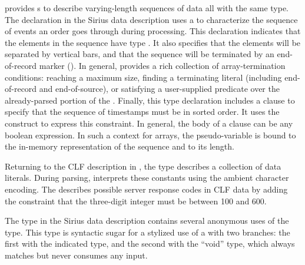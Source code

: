 \documentclass[times]{acm-sigplan}
\newcommand{\dibbler}{Sirius}
\begin{document}
\pads{} provides s to describe varying-length sequences of data all 
with the same type.  The  declaration in the \dibbler{} data description
uses a  to characterize the sequence of events an
order goes through during processing.  This declaration indicates that the elements
in the sequence have type .  It also specifies that the elements will
be separated by vertical bars, and that the sequence will be terminated by 
an end-of-record marker ().  In general, \pads{} provides a rich collection
of array-termination conditions: reaching a maximum size, finding a terminating
literal (including end-of-record and end-of-source),
or satisfying a user-supplied predicate over the already-parsed portion of 
the .  Finally, this type declaration includes a  clause
to specify that the sequence of timestamps must be in sorted order.
It uses the  construct to express this constraint.
In general, the body of a  clause can be any boolean expression.
In such a context for arrays, the pseudo-variable  is bound to the in-memory representation of the sequence and  to its length.

Returning to the CLF description in , the  type  describes
a collection of data literals.  During parsing, \pads{} interprets these
constants using the ambient character encoding.  The  
 describes possible server response codes in CLF data by adding
the constraint that the three-digit integer must be between 100 and 600.

The  type in the \dibbler{} data description contains several
anonymous uses of the  type.  This type is syntactic sugar for a 
stylized use of a  with two branches: the first with the indicated type, and the second with the ``void'' type, which  
always matches but never consumes any input.

\setlength{\floatsep}{0pt}
\setlength{\dblfloatsep}{0pt}
\setcounter{totalnumber}{4}
\setcounter{dbltopnumber}{2}
\begin{figure*}[t!]
\end{figure*}
\end{document}
